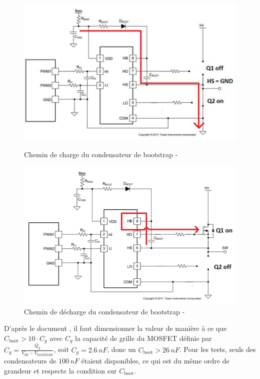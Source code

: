 \documentclass{article}
\begin{document}
\begin{figure}[H]
    \centering
    \begin{minipage}{0.45\textwidth}
        \centering
        \includegraphics[width=\linewidth]{Images/bootstrap_charge.png}
        \caption{Chemin de charge du condensateur de bootstrap - \cite{ref13}
    }
        \label{fig:fig:bootstrap_charge}
    \end{minipage}\hfill
    \begin{minipage}{0.45\textwidth}
        \centering
        \includegraphics[width=\linewidth]{Images/bootstrap_discharge.png}
        \caption{Chemin de décharge du condensateur de bootstrap - \cite{ref13}}
        \label{fig:bootstrap_discharge}
    \end{minipage}\hfill
\end{figure}
\noindent
D'après le document \cite{ref13}, il faut dimensionner la valeur de manière à ce que $C_{\text{boot}}>10\cdot C_{g}$ avec $C_{g}$ la capacité de grille du MOSFET définie par $C_{g} = \frac{Q_{g}}{V_{dd}-V_{\text{bootDiode}}}$, soit $C_{g} = 2.6\,nF$, donc un $C_{\text{boot}} > 26\,nF$. Pour les tests, seuls des condensateurs de $100\,nF$ étaient disponibles, ce qui est du même ordre de grandeur et respecte la condition sur $C_{\text{boot}}$.
\end{document}
